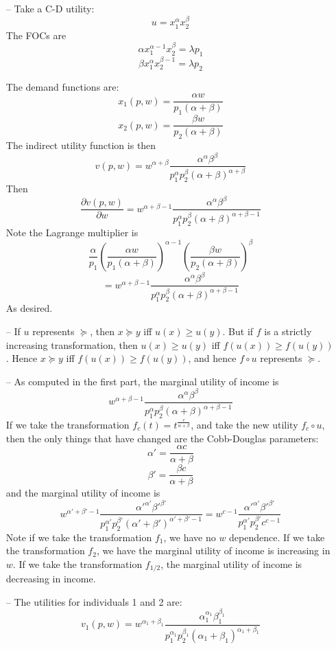 \documentclass[10pt,letter]{article}
\begin{document}
\begin{itemize}
\item[--] Take a C-D utility:
\[ u = x_1^\alpha x_2^{\beta} \]
The FOCs are
\[ \alpha x_1^{\alpha-1} x_2^{\beta} = \lambda p_1 \]
\[ \beta x_1^{\alpha} x_2^{\beta - 1} = \lambda p_2 \]

The demand functions are:
\[ x_1(p,w) = \frac{\alpha w}{p_1(\alpha + \beta)} \]
\[ x_2(p,w) = \frac{\beta w}{p_2(\alpha + \beta)} \]
The indirect utility function is then
\[ v(p,w) = w^{\alpha + \beta}\frac{\alpha^\alpha\beta^\beta }{p_1^\alpha p_2^{\beta} (\alpha + \beta)^{\alpha + \beta}}\]
Then
\[ \frac{\partial v(p,w)}{\partial w} = w^{\alpha + \beta - 1}\frac{\alpha^\alpha\beta^\beta }{p_1^\alpha p_2^{\beta}(\alpha + \beta)^{\alpha + \beta - 1}} \]
Note the Lagrange multiplier is
\[\frac{\alpha}{p_1} \left(\frac{\alpha w}{p_1(\alpha + \beta)}\right)^{\alpha-1}\left( \frac{\beta w}{p_2(\alpha + \beta)} \right)^{\beta}  \]
\[ = w^{\alpha + \beta - 1}\frac{\alpha^\alpha\beta^\beta }{p_1^\alpha p_2^{\beta} (\alpha + \beta)^{\alpha + \beta - 1}}  \]
As desired.
\item[--]
If $u$ represents $\succeq$, then $x \succeq y$ iff $u(x) \ge u(y)$. But if $f$ is a strictly increasing transformation, then $u(x) \ge u(y)$ iff $f(u(x)) \ge f(u(y))$. Hence $x \succeq y$ iff $f(u(x)) \ge f(u(y))$, and hence $f \circ u$ represents $\succeq$.
\item[--]
As computed in the first part, the marginal utility of income is
\[ w^{\alpha + \beta - 1}\frac{\alpha^\alpha\beta^\beta }{p_1^\alpha p_2^{\beta} (\alpha + \beta)^{\alpha + \beta - 1}} \]
If we take the transformation $f_c(t) = t^{\frac{c}{\alpha + \beta}}$, and take the new utility $f_c \circ u$, then the only things that have changed are the Cobb-Douglas parameters:
\[ \alpha' = \frac{\alpha c}{\alpha + \beta} \]
\[ \beta' = \frac{\beta c}{\alpha + \beta} \]
and the marginal utility of income is
\[ w^{\alpha' + \beta' - 1}\frac{\alpha'^{\alpha'}\beta'^{\beta'} }{p_1^{\alpha'} p_2^{\beta'} (\alpha' + \beta')^{\alpha' + \beta' - 1}}  = w^{c-1} \frac{\alpha'^{\alpha'}\beta'^{\beta'} }{p_1^{\alpha'} p_2^{\beta'} c^{c-1}}\]
Note if we take the transformation $f_1$, we have no $w$ dependence. If we take the transformation $f_2$, we have the marginal utility of income is increasing in $w$. If we take the transformation $f_{1/2}$, the marginal utility of income is decreasing in income.
\item[--] The utilities for individuals 1 and 2 are:
\[ v_1(p,w) = w^{\alpha_1 + \beta_1}\frac{\alpha_1^{\alpha_1}\beta_1^{\beta_1} }{p_1^{\alpha_1} p_2^{\beta_1} (\alpha_1 + \beta_1)^{\alpha_1 + \beta_1}} \]

\end{itemize}
\end{document}

